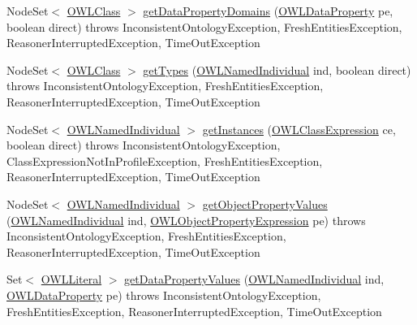 \begin{DoxyCompactItemize}
\item 
Node\-Set$<$ \hyperlink{interfaceorg_1_1semanticweb_1_1owlapi_1_1model_1_1_o_w_l_class}{O\-W\-L\-Class} $>$ \hyperlink{interfaceorg_1_1semanticweb_1_1owlapi_1_1reasoner_1_1_o_w_l_reasoner_afa1eb86c3f5de1a61f76b9c401fcee44}{get\-Data\-Property\-Domains} (\hyperlink{interfaceorg_1_1semanticweb_1_1owlapi_1_1model_1_1_o_w_l_data_property}{O\-W\-L\-Data\-Property} pe, boolean direct)  throws Inconsistent\-Ontology\-Exception, Fresh\-Entities\-Exception, Reasoner\-Interrupted\-Exception, Time\-Out\-Exception
\item 
Node\-Set$<$ \hyperlink{interfaceorg_1_1semanticweb_1_1owlapi_1_1model_1_1_o_w_l_class}{O\-W\-L\-Class} $>$ \hyperlink{interfaceorg_1_1semanticweb_1_1owlapi_1_1reasoner_1_1_o_w_l_reasoner_a0967a7207dc4d927e4542110381d94c4}{get\-Types} (\hyperlink{interfaceorg_1_1semanticweb_1_1owlapi_1_1model_1_1_o_w_l_named_individual}{O\-W\-L\-Named\-Individual} ind, boolean direct)  throws Inconsistent\-Ontology\-Exception, Fresh\-Entities\-Exception, Reasoner\-Interrupted\-Exception, Time\-Out\-Exception
\item 
Node\-Set$<$ \hyperlink{interfaceorg_1_1semanticweb_1_1owlapi_1_1model_1_1_o_w_l_named_individual}{O\-W\-L\-Named\-Individual} $>$ \hyperlink{interfaceorg_1_1semanticweb_1_1owlapi_1_1reasoner_1_1_o_w_l_reasoner_a8bbe84b91ee32baa0ad239d8eae8841e}{get\-Instances} (\hyperlink{interfaceorg_1_1semanticweb_1_1owlapi_1_1model_1_1_o_w_l_class_expression}{O\-W\-L\-Class\-Expression} ce, boolean direct)  throws Inconsistent\-Ontology\-Exception, Class\-Expression\-Not\-In\-Profile\-Exception, Fresh\-Entities\-Exception, Reasoner\-Interrupted\-Exception, Time\-Out\-Exception
\item 
Node\-Set$<$ \hyperlink{interfaceorg_1_1semanticweb_1_1owlapi_1_1model_1_1_o_w_l_named_individual}{O\-W\-L\-Named\-Individual} $>$ \hyperlink{interfaceorg_1_1semanticweb_1_1owlapi_1_1reasoner_1_1_o_w_l_reasoner_a6d30f36914ef3931c4629d2a6f6e3b27}{get\-Object\-Property\-Values} (\hyperlink{interfaceorg_1_1semanticweb_1_1owlapi_1_1model_1_1_o_w_l_named_individual}{O\-W\-L\-Named\-Individual} ind, \hyperlink{interfaceorg_1_1semanticweb_1_1owlapi_1_1model_1_1_o_w_l_object_property_expression}{O\-W\-L\-Object\-Property\-Expression} pe)  throws Inconsistent\-Ontology\-Exception, Fresh\-Entities\-Exception, Reasoner\-Interrupted\-Exception, Time\-Out\-Exception
\item 
Set$<$ \hyperlink{interfaceorg_1_1semanticweb_1_1owlapi_1_1model_1_1_o_w_l_literal}{O\-W\-L\-Literal} $>$ \hyperlink{interfaceorg_1_1semanticweb_1_1owlapi_1_1reasoner_1_1_o_w_l_reasoner_a0e21a5c9c397fc691a120cc2a0ce161c}{get\-Data\-Property\-Values} (\hyperlink{interfaceorg_1_1semanticweb_1_1owlapi_1_1model_1_1_o_w_l_named_individual}{O\-W\-L\-Named\-Individual} ind, \hyperlink{interfaceorg_1_1semanticweb_1_1owlapi_1_1model_1_1_o_w_l_data_property}{O\-W\-L\-Data\-Property} pe)  throws Inconsistent\-Ontology\-Exception, Fresh\-Entities\-Exception, Reasoner\-Interrupted\-Exception, Time\-Out\-Exception

\end{DoxyCompactItemize}
